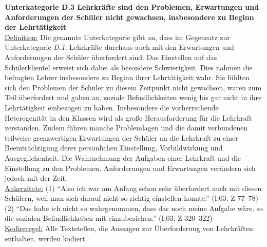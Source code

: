 \textbf{Unterkategorie D.3 Lehrkräfte sind den Problemen, Erwartungen und Anforderungen der Schüler nicht gewachsen, insbesondere zu Beginn der Lehrtätigkeit}\\
\underline{Definition:} Die genannte Unterkategorie gibt an, dass im Gegensatz zur Unterkategorie \textit{D.1}, Lehrkräfte durchaus auch mit den Erwartungen und Anforderungen der Schüler überfordert sind. Das Einstellen auf das Schülerklientel erweist sich dabei als besondere Schwierigkeit. Dies nahmen die befragten Lehrer insbesondere zu Beginn ihrer Lehrtätigkeit wahr. Sie fühlten sich den Problemen der Schüler zu diesem Zeitpunkt nicht gewachsen, waren zum Teil überfordert und gaben an, soziale Befindlichkeiten wenig bis gar nicht in ihre Lehrtätigkeit einbezogen zu haben. Insbesondere die vorherrschende Heterogenität in den Klassen wird als große Herausforderung für die Lehrkraft verstanden. Zudem führen manche Problemlagen und die damit verbundenen teilweise grenzwertigen Erwartungen der Schüler an die Lehrkraft zu einer Beeinträchtigung derer persönlichen Einstellung, Vorbildwirkung und Ausgeglichenheit. Die Wahrnehmung der Aufgaben einer Lehrkraft und die Einstellung zu den Problemen, Anforderungen und Erwartungen verändern sich jedoch mit der Zeit.\\
\underline{Ankerzitate:} (1) "`Also ich war am Anfang schon sehr überfordert auch mit diesen Schülern, weil man sich darauf nicht so richtig einstellen konnte."' (I.03; Z 77--78)\\ (2) "`Das habe ich nicht so wahrgenommen, dass das noch meine Aufgabe wäre, so die sozialen Befindlichkeiten mit einzubeziehen."' (I.03; Z 320--322)\\
\underline{Kodierregel:} Alle Textstellen, die Aussagen zur Überforderung von Lehrkräften enthalten, werden kodiert.\\

